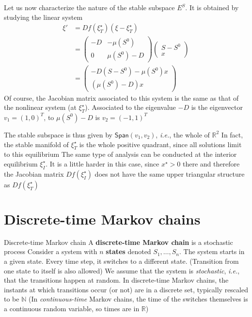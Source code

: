 \documentclass{beamer}
\def\IN{\mathbb{N}}
\def\IR{\mathbb{R}}
\def\ie{\emph{i.e.}}
\def\defword#1{\textbf{#1}}
\newcommand{\Span}{\ensuremath{\mathsf{Span}}}
\begin{document}
\begin{frame}
Let us now characterize the
nature of the stable subspace $E^S$. It is obtained by studying the
linear system
\begin{align}
\xi' &= Df(\xi_T^\star)(\xi-\xi_T^\star) \nonumber \\
&= \left(
\begin{matrix}
-D & -\mu(S^0) \\
0 & \mu(S^0)-D
\end{matrix}
\right)
\left(
\begin{matrix}
S-S^0 \\
x
\end{matrix}
\right) \nonumber \\
&= \left(
\begin{matrix}
-D(S-S^0)-\mu(S^0)x \\
(\mu(S^0)-D)x
\end{matrix}
\right)
\end{align}
Of course, the Jacobian matrix associated to this system is the same
as that of the nonlinear system (at $\xi_T^\star$). Associated to the
eigenvalue $-D$ is the eigenvector $v_1=(1,0)^T$, to $\mu(S^0)-D$ is
$v_2=(-1,1)^T$
\end{frame}

\begin{frame} 
The stable subspace is thus given by $\Span(v_1,v_2)$, \ie,
the whole of $\IR^2$
\vfill
In fact, the stable manifold of $\xi_T^\star$ is the whole positive
quadrant, since all solutions limit to this equilibrium 
\vfill
The same type of analysis can be conducted at the interior equilibrium $\xi_I^\star$. It is a little harder in this case, since $x^\star>0$ there and therefore the Jacobian matrix $Df(\xi_I^\star)$ does not have the same upper triangular structure as $Df(\xi_T^\star)$
\end{frame}

\section{Discrete-time Markov chains}
\begin{frame}{Discrete-time Markov chain}
A \defword{discrete-time Markov chain} is a stochastic process
\vfill
Consider a system with $n$ \defword{states} denoted $S_1,\ldots,S_n$. The system starts in a given state. Every time step, it switches to a different state. (Transition from one state to itself is also allowed)
\vfill
We assume that the system is \emph{stochastic}, \ie, that the transitions happen at random. In discrete-time Markov chains, the instants at which transitions occur (or not) are in a discrete set, typically rescaled to be $\IN$
\vfill
(In \emph{continuous-time} Markov chains, the time of the switches themselves is a continuous random variable, so times are in $\IR$)
\end{frame}
\end{document}
